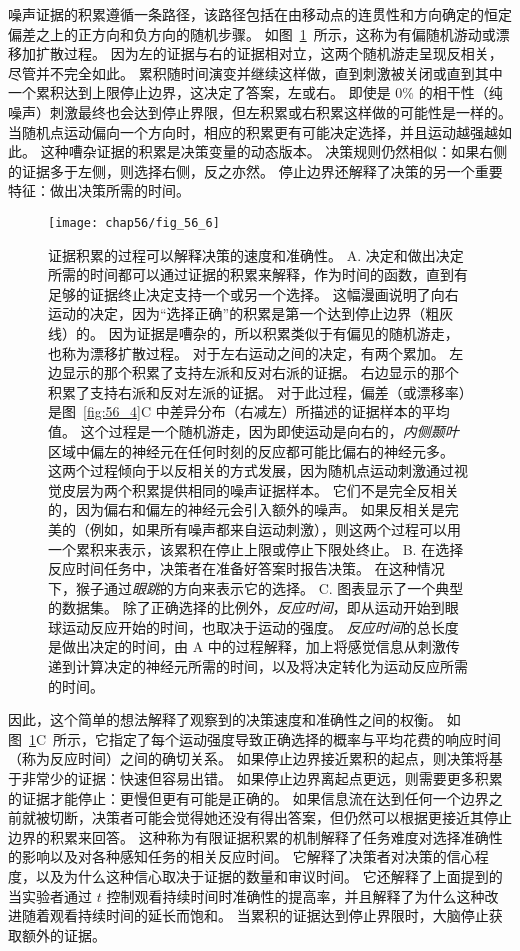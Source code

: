 噪声证据的积累遵循一条路径，该路径包括在由移动点的连贯性和方向确定的恒定偏差之上的正方向和负方向的随机步骤。
如图~\ref{fig:56_6}~所示，这称为有偏随机游动或漂移加扩散过程。
因为左的证据与右的证据相对立，这两个随机游走呈现反相关，尽管并不完全如此。
累积随时间演变并继续这样做，直到刺激被关闭或直到其中一个累积达到上限停止边界，这决定了答案，左或右。
即使是 0\% 的相干性（纯噪声）刺激最终也会达到停止界限，但左积累或右积累这样做的可能性是一样的。
当随机点运动偏向一个方向时，相应的积累更有可能决定选择，并且运动越强越如此。
这种嘈杂证据的积累是决策变量的动态版本。
决策规则仍然相似：如果右侧的证据多于左侧，则选择右侧，反之亦然。
停止边界还解释了决策的另一个重要特征：做出决策所需的时间。


\begin{figure}[htbp]
	\centering
	\texttt{[image: chap56/fig\_56\_6]}
	\caption{证据积累的过程可以解释决策的速度和准确性。
		A. 决定和做出决定所需的时间都可以通过证据的积累来解释，作为时间的函数，直到有足够的证据终止决定支持一个或另一个选择。
		这幅漫画说明了向右运动的决定，因为“选择正确”的积累是第一个达到停止边界（粗灰线）的。
		因为证据是嘈杂的，所以积累类似于有偏见的随机游走，也称为漂移扩散过程。
		对于左右运动之间的决定，有两个累加。
		左边显示的那个积累了支持左派和反对右派的证据。
		右边显示的那个积累了支持右派和反对左派的证据。
		对于此过程，偏差（或漂移率）是图~\ref{fig:56_4}C 中差异分布（右减左）所描述的证据样本的平均值。
		这个过程是一个随机游走，因为即使运动是向右的，\textit{内侧颞叶}区域中偏左的神经元在任何时刻的反应都可能比偏右的神经元多。
		这两个过程倾向于以反相关的方式发展，因为随机点运动刺激通过视觉皮层为两个积累提供相同的噪声证据样本。
		它们不是完全反相关的，因为偏右和偏左的神经元会引入额外的噪声。
		如果反相关是完美的（例如，如果所有噪声都来自运动刺激），则这两个过程可以用一个累积来表示，该累积在停止上限或停止下限处终止。
		B. 在选择反应时间任务中，决策者在准备好答案时报告决策。
		在这种情况下，猴子通过\textit{眼跳}的方向来表示它的选择。
		C. 图表显示了一个典型的数据集。
		除了正确选择的比例外，\textit{反应时间}，即从运动开始到眼球运动反应开始的时间，也取决于运动的强度。
		\textit{反应时间}的总长度是做出决定的时间，由 A 中的过程解释，加上将感觉信息从刺激传递到计算决定的神经元所需的时间，以及将决定转化为运动反应所需的时间\cite{gold2007neural}。 }
	\label{fig:56_6}
\end{figure}


因此，这个简单的想法解释了观察到的决策速度和准确性之间的权衡。
如图~\ref{fig:56_6}C~所示，它指定了每个运动强度导致正确选择的概率与平均花费的响应时间（称为反应时间）之间的确切关系。
如果停止边界接近累积的起点，则决策将基于非常少的证据：快速但容易出错。
如果停止边界离起点更远，则需要更多积累的证据才能停止：更慢但更有可能是正确的。
如果信息流在达到任何一个边界之前就被切断，决策者可能会觉得她还没有得出答案，但仍然可以根据更接近其停止边界的积累来回答。
这种称为有限证据积累的机制解释了任务难度对选择准确性的影响以及对各种感知任务的相关反应时间。
它解释了决策者对决策的信心程度，以及为什么这种信心取决于证据的数量和审议时间。
它还解释了上面提到的当实验者通过 $ t $ 控制观看持续时间时准确性的提高率，并且解释了为什么这种改进随着观看持续时间的延长而饱和。
当累积的证据达到停止界限时，大脑停止获取额外的证据。



